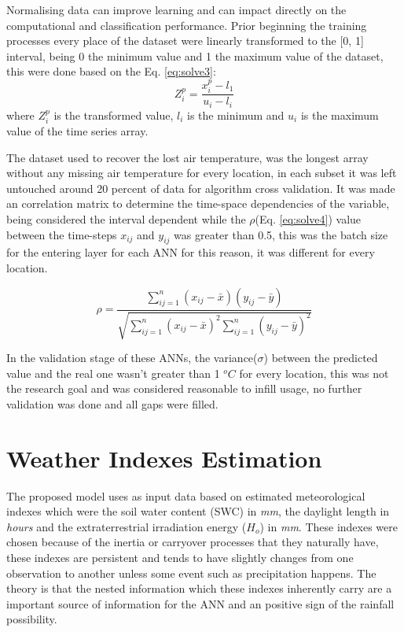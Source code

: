 Normalising data can improve learning and can impact directly on the computational and classification performance\cite{shanker1996effect}. Prior beginning the training processes every place of the dataset were linearly transformed to the [0, 1] interval, being 0 the minimum value and 1 the maximum value of the dataset, this were done based on the Eq. \ref{eq:solve3}:
\begin{equation}
\label{eq:solve3}
Z_i^p = \frac{x_i^p - l_1}{u_i -l_i}
\end{equation}
where $Z_i^p$ is the transformed value, $l_i$ is the minimum and $u_i$ is the maximum value of the time series array. 

The dataset used to recover the lost air temperature, was the longest array without any missing air temperature for every location, in each subset it was left 
untouched around 20 percent of data for algorithm cross validation. It was made an correlation matrix to determine the time-space dependencies of the variable, being 
considered the interval dependent while the $\rho$(Eq. \ref{eq:solve4}) value between the time-steps $x_{ij}$ and $y_{ij}$ was greater than 0.5, this was the
batch size for the entering layer for each ANN for this reason, it was different for every location.

\begin{equation}
\label{eq:solve4}
\rho = \frac{ \sum\limits_{ij=1}^n (x_{ij} - \bar{x})(y_{ij} - \bar{y})}{\sqrt{ \sum\limits_{ij=1}^n (x_{ij} - \bar{x})^2 \sum\limits_{ij=1}^n (y_{ij} - \bar{y})^2}}
\end{equation}

In the validation stage of these ANNs, the variance($\sigma$) between the predicted value and the real one wasn't greater than 1 $^oC$ for every location, this was not the research goal and was considered reasonable to infill usage, no further validation was done and all gaps were filled.

\section{Weather Indexes Estimation}
\label{sec:linux}

The proposed model uses as input data based on estimated meteorological indexes which were the soil water content (SWC) in \textit{mm}, the daylight length in \textit{hours} and the extraterrestrial irradiation energy ($H_o$) in \textit{mm}. These indexes were chosen because of the inertia or carryover processes that they naturally have, these indexes are persistent and tends to have slightly changes from one observation to another unless some event such as precipitation happens. The theory is that the nested information which these indexes inherently carry are a important source of information for the ANN and an positive sign of the rainfall possibility.

